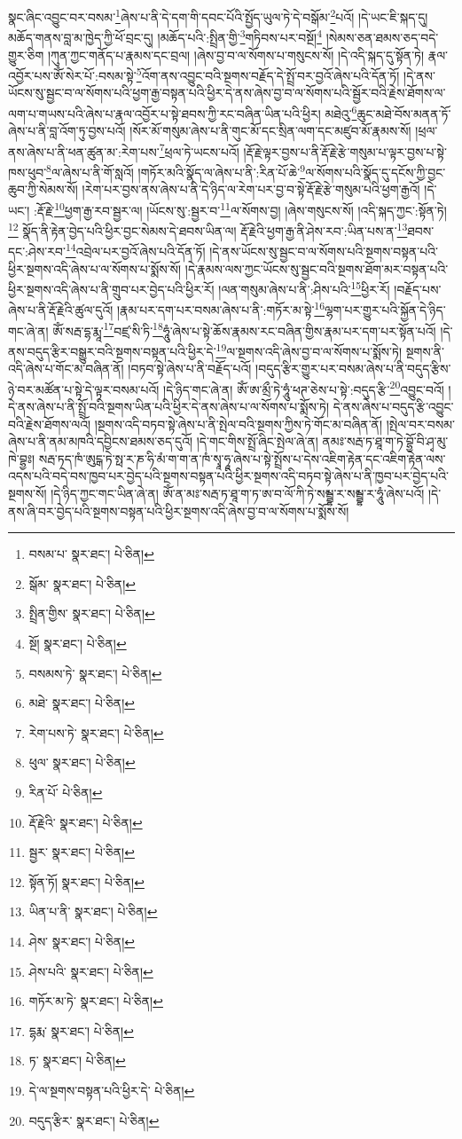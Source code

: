 སྣང་ཞིང་འབྱུང་བར་བསམ་\footnote{བསམ་པ་  སྣར་ཐང་།  པེ་ཅིན། }ཞེས་པ་ནི་དེ་དག་གི་དབང་པོའི་སྤྱོད་ཡུལ་ཏེ་དེ་བསྒོམ་\footnote{སྒོམ་  སྣར་ཐང་།  པེ་ཅིན། }པའོ། །དེ་ཡང་ཇི་སྐད་དུ། མཆོད་གནས་བླ་མ་ཁྱེད་ཀྱི་ཕོ་བྲང་དུ། །མཆོད་པའི་:སྤྲིན་གྱི་\footnote{སྤྲིན་གྱིས་  སྣར་ཐང་།  པེ་ཅིན། }གཏིབས་པར་བསྔོ།\footnote{སྔོ།  སྣར་ཐང་།  པེ་ཅིན། } །སེམས་ཅན་ཐམས་ཅད་བདེ་གྱུར་ཅིག །ཀུན་ཀྱང་གནོད་པ་རྣམས་དང་བྲལ། །ཞེས་བྱ་བ་ལ་སོགས་པ་གསུངས་སོ། །དེ་འདི་སྐད་དུ་སྟོན་ཏེ། རྣལ་འབྱོར་པས་ཨོཾ་སེར་པོ་:བསམ་སྟེ་\footnote{བསམས་ཏེ་  སྣར་ཐང་།  པེ་ཅིན། }འོག་ནས་འབྱུང་བའི་སྔགས་བརྗོད་དེ་སྤྲོ་བར་བྱའོ་ཞེས་པའི་དོན་ཏོ། །དེ་ནས་ཡོངས་སུ་སྦྱང་བ་ལ་སོགས་པའི་ཕྱག་རྒྱ་བསྟན་པའི་ཕྱིར་དེ་ནས་ཞེས་བྱ་བ་ལ་སོགས་པའི་སྦྱོར་བའི་རྗེས་ཐོགས་ལ་ལག་པ་གཡས་པའི་ཞེས་པ་རྣལ་འབྱོར་པ་སྟེ་ཐབས་ཀྱི་རང་བཞིན་ཡིན་པའི་ཕྱིར། མཐེའུ་\footnote{མཐེ་  སྣར་ཐང་།  པེ་ཅིན། }ཆུང་མཐེ་བོས་མནན་ཏོ་ཞེས་པ་ནི་བླ་འོག་ཏུ་བྱས་པའོ། །སོར་མོ་གསུམ་ཞེས་པ་ནི་གུང་མོ་དང་སྲིན་ལག་དང་མཛུབ་མོ་རྣམས་སོ། །ཕྲལ་ནས་ཞེས་པ་ནི་ཕན་ཚུན་མ་:རེག་པས་\footnote{རེག་པས་ཏེ་  སྣར་ཐང་།  པེ་ཅིན། }ཕྲལ་ཏེ་ཡངས་པའོ། །རྡོ་རྗེ་ལྟར་བྱས་པ་ནི་རྡོ་རྗེ་རྩེ་གསུམ་པ་ལྟར་བྱས་པ་སྟེ་ཁས་ཕུབ་\footnote{ཕུལ་  སྣར་ཐང་།  པེ་ཅིན། }ལ་ཞེས་པ་ནི་གོ་སླའོ། །གཏོར་མའི་སྣོད་ལ་ཞེས་པ་ནི་:རིན་པོ་ཆེ་\footnote{རིན་པོ་  པེ་ཅིན། }ལ་སོགས་པའི་སྣོད་དུ་དངོས་ཀྱི་བྱང་ཆུབ་ཀྱི་སེམས་སོ། །རེག་པར་བྱས་ནས་ཞེས་པ་ནི་དེ་ཉིད་ལ་རེག་པར་བྱ་བ་སྟེ་རྡོ་རྗེ་རྩེ་གསུམ་པའི་ཕྱག་རྒྱའོ། །དེ་ཡང་། :རྡོ་རྗེ་\footnote{རྡོ་རྗེའི་  སྣར་ཐང་།  པེ་ཅིན། }ཕྱག་རྒྱ་རབ་སྦྱར་ལ། །ཡོངས་སུ་:སྦྱར་བ་\footnote{སྦྱར་  སྣར་ཐང་།  པེ་ཅིན། }ལ་སོགས་བྱ། །ཞེས་གསུངས་སོ། །འདི་སྐད་ཀྱང་:སྟོན་ཏེ།\footnote{སྟོན་ཏོ།  སྣར་ཐང་།  པེ་ཅིན། } སྣོད་ནི་རྟེན་བྱེད་པའི་ཕྱིར་བྱང་སེམས་དེ་ཐབས་ཡིན་ལ། རྡོ་རྗེའི་ཕྱག་རྒྱ་ནི་ཤེས་རབ་:ཡིན་པས་ན་\footnote{ཡིན་པ་ནི་  སྣར་ཐང་།  པེ་ཅིན། }ཐབས་དང་:ཤེས་རབ་\footnote{ཤེས་  སྣར་ཐང་།  པེ་ཅིན། }འབྲེལ་པར་བྱའོ་ཞེས་པའི་དོན་ཏོ། །དེ་ནས་ཡོངས་སུ་སྦྱང་བ་ལ་སོགས་པའི་སྔགས་བསྟན་པའི་ཕྱིར་སྔགས་འདི་ཞེས་པ་ལ་སོགས་པ་སྨོས་སོ། །དེ་རྣམས་ལས་ཀྱང་ཡོངས་སུ་སྦྱང་བའི་སྔགས་ཐོག་མར་བསྟན་པའི་ཕྱིར་སྔགས་འདི་ཞེས་པ་ནི་གྲུབ་པར་བྱེད་པའི་ཕྱིར་རོ། །ལན་གསུམ་ཞེས་པ་ནི་:ཤིས་པའི་\footnote{ཤེས་པའི་  སྣར་ཐང་།  པེ་ཅིན། }ཕྱིར་རོ། །བརྗོད་པས་ཞེས་པ་ནི་རྡོ་རྗེའི་ཚུལ་དུའོ། །རྣམ་པར་དག་པར་བསམ་ཞེས་པ་ནི་:གཏོར་མ་སྟེ་\footnote{གཏོར་མ་ཏེ་  སྣར་ཐང་།  པེ་ཅིན། }ལྷག་པར་གྱུར་པའི་སྐྱོན་དེ་ཉིད་གང་ཞེ་ན། ཨོཾ་སརྦ་དྷ་རྨཱ་\footnote{དྷརྨ་  སྣར་ཐང་།  པེ་ཅིན། }བཛྲ་སི་ཏི་\footnote{ཏ་  སྣར་ཐང་།  པེ་ཅིན། }ཧཱུཾ་ཞེས་པ་སྟེ་ཆོས་རྣམས་རང་བཞིན་གྱིས་རྣམ་པར་དག་པར་སྟོན་པའོ། །དེ་ནས་བདུད་རྩིར་བསྒྱུར་བའི་སྔགས་བསྟན་པའི་ཕྱིར་དེ་\footnote{དེ་ལ་སྔགས་བསྟན་པའི་ཕྱིར་དེ་  པེ་ཅིན། }ལ་སྔགས་འདི་ཞེས་བྱ་བ་ལ་སོགས་པ་སྨོས་ཏེ། སྔགས་ནི་འདི་ཞེས་པ་གོང་མ་བཞིན་ནོ། །བཏབ་སྟེ་ཞེས་པ་ནི་བརྗོད་པའོ། །བདུད་རྩིར་གྱུར་པར་བསམ་ཞེས་པ་ནི་བདུད་རྩིས་ཉེ་བར་མཚོན་པ་སྟེ་དེ་ལྟར་བསམ་པའོ། །དེ་ཉིད་གང་ཞེ་ན། ཨོཾ་ཨ་མྲྀ་ཏེ་ཧཱུཾ་ཕཊ་ཅེས་པ་སྟེ་:བདུད་རྩི་\footnote{བདུད་རྩིར་  སྣར་ཐང་།  པེ་ཅིན། }འབྱུང་བའོ། །དེ་ནས་ཞེས་པ་ནི་སྤྲོ་བའི་སྔགས་ཡིན་པའི་ཕྱིར་དེ་ནས་ཞེས་པ་ལ་སོགས་པ་སྨོས་ཏེ། དེ་ནས་ཞེས་པ་བདུད་རྩི་འབྱུང་བའི་རྗེས་ཐོགས་ལའོ། །སྔགས་འདི་བཏབ་སྟེ་ཞེས་པ་ནི་སྤེལ་བའི་སྔགས་ཀྱིས་ཏེ་གོང་མ་བཞིན་ནོ། །སྤེལ་བར་བསམ་ཞེས་པ་ནི་ནམ་མཁའི་དབྱིངས་ཐམས་ཅད་དུའོ། །དེ་གང་གིས་སྤྲོ་ཞིང་སྤེལ་ཞེ་ན། ནམཿ་སརྦ་ཏ་ཐཱ་ག་ཏེ་བྷྱོ་བི་ཤྭ་མུ་ཁེ་བྷྱཿ། སརྦ་ཏད་ཁཾ་ཨུངྒ་ཏེ་སྥ་ར་ཎ་ཧི་མཾ་ག་ག་ན་ཁཾ་སྭཱ་ཧཱ་ཞེས་པ་སྟེ་སྤྲོས་པ་དེས་འཇིག་རྟེན་དང་འཇིག་རྟེན་ལས་འདས་པའི་བདེ་བས་ཁྱབ་པར་བྱེད་པའི་སྔགས་བསྟན་པའི་ཕྱིར་སྔགས་འདི་བཏབ་སྟེ་ཞེས་པ་ནི་ཁྱབ་པར་བྱེད་པའི་སྔགས་སོ། །དེ་ཉིད་ཀྱང་གང་ཡིན་ཞེ་ན། ཨོཾ་ན་མཿ་སརྦ་ཏ་ཐཱ་ག་ཏ་ཨ་བ་ལོ་ཀི་ཏེ་སམྦྷ་ར་སམྦྷ་ར་ཧཱུཾ་ཞེས་པའོ། །དེ་ནས་ཞི་བར་བྱེད་པའི་སྔགས་བསྟན་པའི་ཕྱིར་སྔགས་འདི་ཞེས་བྱ་བ་ལ་སོགས་པ་སྨོས་སོ། 